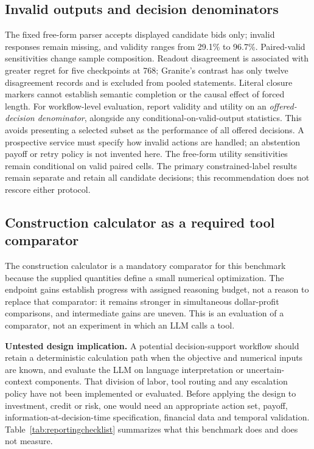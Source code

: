 \documentclass[sigconf,anonymous,nonacm]{acmart}
\begin{document}
\subsection{Invalid outputs and decision denominators}
The fixed free-form parser accepts displayed candidate bids only; invalid responses remain missing, and validity ranges from 29.1\% to 96.7\%. Paired-valid sensitivities change sample composition. Readout disagreement is associated with greater regret for five checkpoints at 768; Granite's contrast has only twelve disagreement records and is excluded from pooled statements. Literal closure markers cannot establish semantic completion or the causal effect of forced length.
For workflow-level evaluation, report validity and utility on an \emph{offered-decision denominator}, alongside any conditional-on-valid-output statistics. This avoids presenting a selected subset as the performance of all offered decisions. A prospective service must specify how invalid actions are handled; an abstention payoff or retry policy is not invented here. The free-form utility sensitivities remain conditional on valid paired cells. The primary constrained-label results remain separate and retain all candidate decisions; this recommendation does not rescore either protocol.

\subsection{Construction calculator as a required tool comparator}
The construction calculator is a mandatory comparator for this benchmark because the supplied quantities define a small numerical optimization. The endpoint gains establish progress with assigned reasoning budget, not a reason to replace that comparator: it remains stronger in simultaneous dollar-profit comparisons, and intermediate gains are uneven. This is an evaluation of a comparator, not an experiment in which an LLM calls a tool.

\textbf{Untested design implication.} A potential decision-support workflow should retain a deterministic calculation path when the objective and numerical inputs are known, and evaluate the LLM on language interpretation or uncertain-context components. That division of labor, tool routing and any escalation policy have not been implemented or evaluated. Before applying the design to investment, credit or risk, one would need an appropriate action set, payoff, information-at-decision-time specification, financial data and temporal validation. Table~\ref{tab:reportingchecklist} summarizes what this benchmark does and does not measure.
\end{document}
